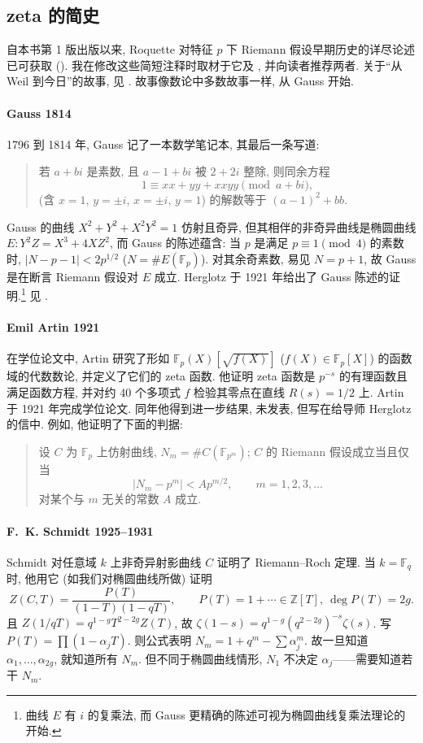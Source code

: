 \subsection*{zeta 的简史}

自本书第 1 版出版以来, Roquette 对特征 $p$ 下 Riemann 假设早期历史的详尽论述已可获取 (\cite{roquette2018}). 我在修改这些简短注释时取材于它及 \cite{oort2016}, 并向读者推荐两者. 关于``从 Weil 到今日''的故事, 见 \cite{milne2016}. 故事像数论中多数故事一样, 从 Gauss 开始.

\paragraph{Gauss 1814}\label{para:gauss1814}
1796 到 1814 年, Gauss 记了一本数学笔记本, 其最后一条写道:
\begin{quote}\small
若 $a + bi$ 是素数, 且 $a - 1 + bi$ 被 $2 + 2i$ 整除, 则同余方程
\[
1\equiv xx + yy + xxyy \pmod{a + bi},
\]
(含 $x = 1$, $y = \pm i$, $x = \pm i$, $y = 1$) 的解数等于 $(a-1)^2 + bb$.
\end{quote}
Gauss 的曲线 $X^2 + Y^2 + X^2Y^2 = 1$ 仿射且奇异, 但其相伴的非奇异曲线是椭圆曲线 $E\colon Y^2Z = X^3 + 4XZ^2$, 而 Gauss 的陈述蕴含: 当 $p$ 是满足 $p\equiv 1\pmod{4}$ 的素数时, $|N - p - 1| < 2p^{1/2}$ ($N = \#E(\mathbb{F}_p)$). 对其余奇素数, 易见 $N = p + 1$, 故 Gauss 是在断言 Riemann 假设对 $E$ 成立. Herglotz 于 1921 年给出了 Gauss 陈述的证明.\footnote{曲线 $E$ 有 $i$ 的复乘法, 而 Gauss 更精确的陈述可视为椭圆曲线复乘法理论的开始.} 见 \cite[3.4]{roquette2018}.

\paragraph{Emil Artin 1921}
在学位论文中, Artin 研究了形如 $\mathbb{F}_p(X)[\sqrt{f(X)}]$ ($f(X)\in\mathbb{F}_p[X]$) 的函数域的代数数论, 并定义了它们的 zeta 函数. 他证明 zeta 函数是 $p^{-s}$ 的有理函数且满足函数方程, 并对约 40 个多项式 $f$ 检验其零点在直线 $R(s) = 1/2$ 上. Artin 于 1921 年完成学位论文. 同年他得到进一步结果, 未发表, 但写在给导师 Herglotz 的信中. 例如, 他证明了下面的判据:
\begin{quote}\small
设 $C$ 为 $\mathbb{F}_p$ 上仿射曲线, $N_m = \#C(\mathbb{F}_{p^m})$; $C$ 的 Riemann 假设成立当且仅当
\[
|N_m - p^m| < Ap^{m/2}, \qquad m = 1, 2, 3, \dots
\]
对某个与 $m$ 无关的常数 $A$ 成立.
\end{quote}

\paragraph{F.~K. Schmidt 1925--1931}
Schmidt 对任意域 $k$ 上非奇异射影曲线 $C$ 证明了 Riemann--Roch 定理. 当 $k = \mathbb{F}_q$ 时, 他用它 (如我们对椭圆曲线所做) 证明
\[
Z(C, T) = \frac{P(T)}{(1-T)(1-qT)}, \qquad P(T) = 1 + \cdots\in\mathbb{Z}[T], \ \deg P(T) = 2g.
\]
且 $Z(1/qT) = q^{1-g}T^{2-2g}Z(T)$, 故 $\zeta(1-s) = q^{1-g}(q^{2-2g})^{-s}\zeta(s)$. 写 $P(T) = \prod(1-\alpha_jT)$. 则公式表明 $N_m = 1 + q^m - \sum\alpha_j^m$. 故一旦知道 $\alpha_1, \dots, \alpha_{2g}$, 就知道所有 $N_m$. 但不同于椭圆曲线情形, $N_1$ 不决定 $\alpha_j$——需要知道若干 $N_m$.

